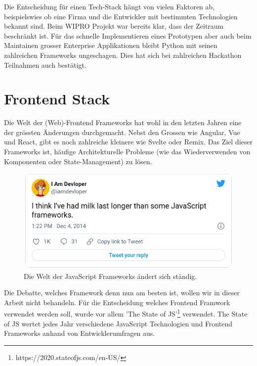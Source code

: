 Die Entscheidung für einen Tech-Stack hängt von vielen Faktoren ab, beispielswies
ob eine Firma und die Entwickler mit bestimmten Technologien bekannt sind.
Beim WIPRO Projekt war bereits klar, dass der Zeitraum beschränkt ist.
Für das schnelle Implementieren eines Prototypen aber auch beim Maintainen
grosser Enterprise Applikationen bleibt Python mit seinen zahlreichen
Frameworks ungeschagen. Dies hat sich bei zahlreichen Hackathon Teilnahmen
auch bestätigt.

\section{Frontend Stack}

Die Welt der (Web)-Frontend Frameworks hat wohl in den letzten Jahren eine der grössten Änderungen
durchgemacht. Nebst den Grossen wie Angular, Vue und React, gibt es noch zahlreiche kleinere wie Svelte oder
Remix. Das Ziel dieser Frameworks ist, häufige Architekturelle Probleme (wie das Wiederverwenden von Komponenten
oder State-Management) zu lösen.\cite{do-i-need-a-frontend-fwk}

\begin{figure}[htbp]
    \centering
    \includegraphics{gfx/js-milk}
    \caption{
        Die Welt der JavaScript Frameworks ändert sich ständig.\cite{twitter-js-state}
    }
    \label{fig:frontend-stack}
\end{figure}

Die Debatte, welches Framework denn nun am besten ist, wollen wir in dieser Arbeit nicht behandeln.
Für die Entscheidung welches Frontend Framwork verwendet werden soll, wurde vor allem 'The State of JS'\footnote{https://2020.stateofjs.com/en-US/}
verwendet. The State of JS wertet jedes Jahr verschiedene JavaScript Technologien und Frontend Frameworks
anhand von Entwicklerumfragen aus.\cite{state-of-js-2020-fwk}





